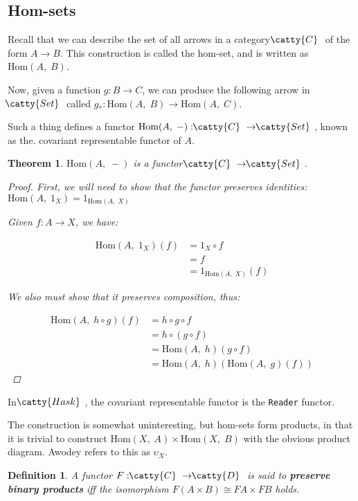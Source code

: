 \documentclass[]{article}
\newtheorem{theorem}{Theorem}
\newtheorem{definition}{Definition}
\renewcommand{\hom}[2]{\ensuremath{\text{Hom}(#1,\;#2)}}
\newcommand{\tfarr}[4][\to]{\ensuremath{#2 : #3 #1 #4}}
\newcommand{\functor}[3]{\ensuremath{#1 : \cat{#2} \to \cat{#3}}}
\newcommand{\cat}[1]{\ensuremath{\!\! \catty{#1} \,\,}}
\begin{document}
\subsection{Hom-sets}

Recall that we can describe the set of all arrows in a category \cat{C} of the
form $A\to B$. This construction is called the hom-set, and is written as
\hom{A}{B}.

Now, given a function \tfarr{g}{B}{C}, we can produce the following arrow in
\cat{Set} called \tfarr{g_*}{\hom{A}{B}}{\hom{A}{C}}.

Such a thing defines a functor \functor{\hom{A}{-}}{C}{Set}, known as the.
covariant representable functor of $A$.

\begin{theorem}
  \hom{A}{-} is a functor $\cat{C}\to\cat{Set}$.

  \begin{proof}
    First, we will need to show that the functor preserves identities:
    $\hom{A}{1_X} = 1_{\hom{A}{X}}$

    Given \tfarr{f}{A}{X}, we have:

    \begin{align*}
      \hom{A}{1_X}(f) &= 1_X \circ f \\ &= f \\ &= 1_{\hom{A}{X}}(f)
    \end{align*}

    We also must show that it preserves composition, thus:

    \begin{align*}
      \hom{A}{h \circ g}(f) &= h \circ g \circ f \\ & =h \circ (g \circ f) \\ &=
      \hom{A}{h}(g \circ f) \\ &= \hom{A}{h}(\hom{A}{g}(f))
    \end{align*}
  \end{proof}
\end{theorem}

In \cat{Hask}, the covariant representable functor is the \texttt{Reader}
functor.

The construction is somewhat uninteresting, but hom-sets form products, in that
it is trivial to construct $\hom{X}{A} \times \hom{X}{B}$ with the obvious
product diagram. Awodey refers to this as $\upsilon_X$.

\begin{definition}
  A functor \functor{F}{C}{D} is said to \textbf{preserve binary products} iff
  the isomorphism $F(A\times B) \cong FA \times FB$ holds.
\end{definition}
\end{document}
